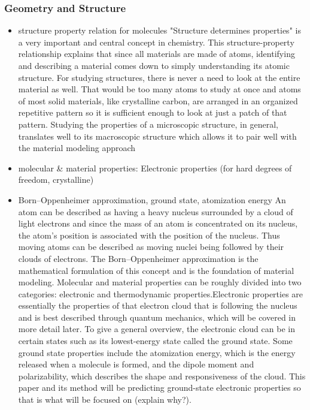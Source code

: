 \documentclass[12pt]{scrartcl}
\begin{document}
\subsubsection{Geometry and Structure}
\begin{itemize}
  \item structure property relation for molecules
  \newline "Structure determines properties" is a very important and central concept in chemistry. This structure-property relationship explains that since all materials are made of atoms, identifying and describing a material comes down to simply understanding its atomic structure. For studying structures, there is never a need to look at the entire material as well. That would be too many atoms to study at once and atoms of most solid materials, like crystalline carbon, are arranged in an organized repetitive pattern so it is sufficient enough to look at just a patch of that pattern. Studying the properties of a microscopic structure, in general, translates well to its macroscopic structure which allows it to pair well with the material modeling approach
  \item molecular \& material properties: Electronic properties (for hard degrees of freedom, crystalline)
  \item Born–Oppenheimer approximation, ground state, atomization energy
  \newline An atom can be described as having a heavy nucleus surrounded by a cloud of light electrons and since the mass of an atom is concentrated on its nucleus, the atom's position is associated with the position of the nucleus. Thus moving atoms can be described as moving nuclei being followed by their clouds of electrons. The Born–Oppenheimer approximation is the mathematical formulation of this concept and is the foundation of material modeling. Molecular and material properties can be roughly divided into two categories: electronic and thermodynamic properties.Electronic properties are essentially the properties of that electron cloud that is following the nucleus and is best described through quantum mechanics, which will be covered in more detail later. To give a general overview, the electronic cloud can be in certain states such as its lowest-energy state called the ground state. Some ground state properties include the atomization energy, which is the energy released when a molecule is formed, and the dipole moment and polarizability, which describes the shape and responsiveness of the cloud. This paper and its method will be predicting ground-state electronic properties so that is what will be focused on (explain why?). 
\end{itemize}
\end{document}
